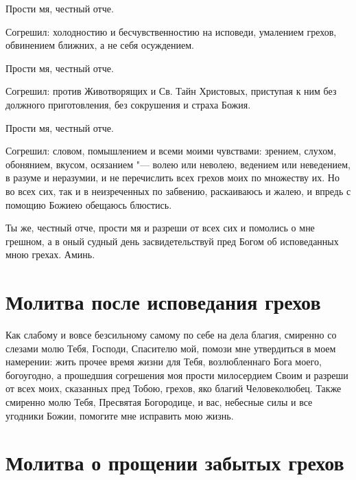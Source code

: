 \begin{mymulticols}
Прости мя, честный отче. 



Согрешил: холодностию и бесчувственностию на исповеди, умалением грехов, обвинением ближних, а не себя осуждением. 



Прости мя, честный отче. 



Согрешил: против Животворящих и Св. Тайн Христовых, приступая к ним без должного приготовления, без сокрушения и страха Божия. 



Прости мя, честный отче. 



Согрешил: словом, помышлением и всеми моими чувствами: зрением, слухом, обонянием, вкусом, осязанием "--- волею или неволею, ведением или неведением, в разуме и неразумии, и не перечислить всех грехов моих по множеству их. Но во всех сих, так и в неизреченных по забвению, раскаиваюсь и жалею, и впредь с помощию Божиею обещаюсь блюстись. 



Ты же, честный отче, прости мя и разреши от всех сих и помолись о мне грешном, а в оный судный день засвидетельствуй пред Богом об исповеданных мною грехах. Аминь. 

\end{mymulticols}

\newpage\section{Молитва после исповедания грехов}
 
\begin{mymulticols}

Как слабому и вовсе безсильному самому по себе на дела благия, смиренно со слезами молю Тебя, Господи, Спасителю мой, помози мне утвердиться в моем намерении: жить прочее время жизни для Тебя, возлюбленнаго Бога моего, богоугодно, а прошедшия согрешения моя прости милосердием Своим и разреши от всех моих, сказанных пред Тобою, грехов, яко благий Человеколюбец. Также смиренно молю Тебя, Пресвятая Богородице, и вас, небесные силы и все угодники Божии, помогите мне исправить мою жизнь.

\end{mymulticols}

\section{Молитва о прощении забытых грехов}
 
